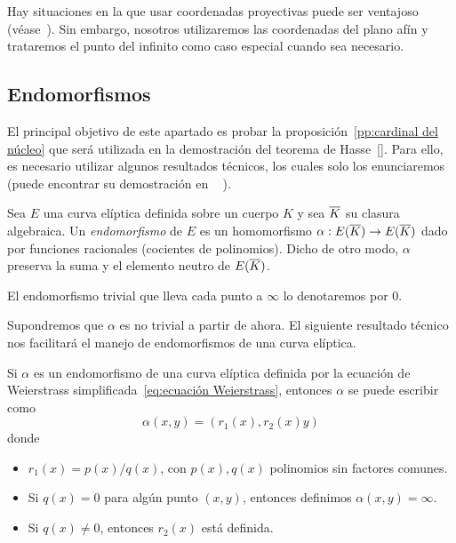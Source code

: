 Hay situaciones en la que usar coordenadas proyectivas puede ser ventajoso (véase~\cite[sec 2.6]{Washington:2008}). Sin embargo, nosotros utilizaremos las coordenadas del plano afín y trataremos el punto del infinito como caso especial cuando sea necesario.


\subsection{Endomorfismos}
\label{sub:Endomorfismos}

El principal objetivo de este apartado es probar la proposición~\ref{pp:cardinal del núcleo} que será utilizada en la demostración del teorema de Hasse~\ref{}. Para ello, es necesario utilizar algunos resultados técnicos, los cuales solo los enunciaremos (puede encontrar su demostración en ~\cite[sec. 2.9]{Washington:2008} ).

\begin{definicion}
	Sea $E$ una curva elíptica definida sobre un cuerpo $K$ y sea $\overline{K}$ su clasura algebraica. Un \emph{endomorfismo} de $E$ es un homomorfismo $\alpha: E(\overline{K}) \to E(\overline{K})$ dado por funciones racionales (cocientes de polinomios). Dicho de otro modo, $\alpha$ preserva la suma y el elemento neutro de $E(\overline{K})$.

	El endomorfismo trivial que lleva cada punto a $\infty$ lo denotaremos por 0.
\end{definicion}

Supondremos que $\alpha$ es no trivial a partir de ahora. El siguiente resultado técnico nos facilitará el manejo de endomorfismos de una curva elíptica.

\begin{lema}\label{lm:endomorfismo con funciones racionales}
	Si $\alpha$ es un endomorfismo de una curva elíptica definida por la ecuación de Weierstrass simplificada~\eqref{eq:ecuación Weierstrass}, entonces $\alpha$ se puede escribir como
	$$
	\alpha(x, y) = (r_1(x), r_2(x) y)
	$$
	donde
	\begin{itemize}
		\item $r_1(x) = p(x) / q(x)$, con $p(x), q(x)$ polinomios sin factores comunes.
		\item Si $q(x) = 0$ para algún punto $(x, y)$, entonces definimos $\alpha(x, y) = \infty$.
		\item Si $q(x) \neq 0$, entonces $r_2(x)$ está definida.
	\end{itemize}
\end{lema}

